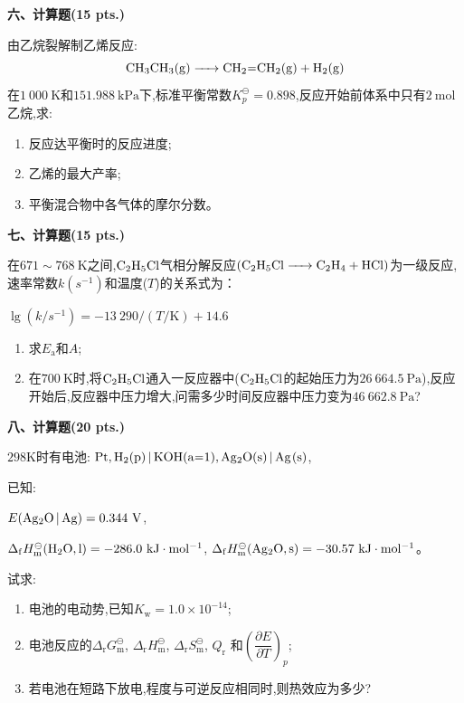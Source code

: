 \vspace{0.5cm}
\noindent\textbf{六、计算题(15 pts.)}

由乙烷裂解制乙烯反应:
\[
\ce{CH3CH3(g) -> CH2=CH2(g) + H2(g)}
\]
在$1\ 000\ \mathrm{K}$和$151.988\ \mathrm{kPa}$下,标准平衡常数$K_p^\ominus=0.898$,反应开始前体系中只有$2\ \mathrm{mol}$乙烷,求:
\begin{enumerate}[label=(\arabic*), itemsep=1ex]
    \item 反应达平衡时的反应进度;
    \item 乙烯的最大产率;
    \item 平衡混合物中各气体的摩尔分数。
\end{enumerate}

\vspace{0.5cm}
\noindent\textbf{七、计算题(15 pts.)}

在$671\sim768\ \mathrm{K}$之间,$\ce{C2H5Cl}$气相分解反应$\ce{(C2H5Cl -> C2H4 + HCl)}$为一级反应,速率常数$k(s^{-1})$和温度($T$)的关系式为：

    {\centering
    $\lg(k/s^{-1})=-13\ 290/(T/\mathrm{K})+14.6$ \par
    }

\begin{enumerate}[label=(\arabic*), itemsep=1ex]
    \item 求$E_\mathrm{a}$和$A$;
    \item 在$700\ \mathrm{K}$时,将$\ce{C2H5Cl}$通入一反应器中($\ce{C2H5Cl}$的起始压力为$26\ 664.5\ \mathrm{Pa}$),反应开始后,反应器中压力增大,问需多少时间反应器中压力变为$46\ 662.8\ \mathrm{Pa}$?
\end{enumerate}

\vspace{0.5cm}
\noindent\textbf{八、计算题(20 pts.)}

$298\mathrm{K}$时有电池:
$\ce{Pt,H2(p) | KOH(a=1),Ag2O(s) | Ag(s)}$,

已知:

$E(\ce{Ag2O | Ag})=0.344\ \mathrm{V}$,

$\Delta_\mathrm{f}H_\mathrm{m}^\ominus(\ce{H2O,l})=-286.0\ \mathrm{kJ\cdot mol^{-1}}$, $\Delta_\mathrm{f}H_\mathrm{m}^\ominus(\ce{Ag2O,s})=-30.57\ \mathrm{kJ\cdot mol^{-1}}$。

试求:
\begin{enumerate}[label=(\arabic*), itemsep=1ex]
    \item 电池的电动势,已知$K_\mathrm{w}=1.0\times10^{-14}$;
    \item 电池反应的$\Delta_\mathrm{r}G_\mathrm{m}^\ominus$, $\Delta_\mathrm{r}H_\mathrm{m}^\ominus$, $\Delta_\mathrm{r}S_\mathrm{m}^\ominus$, $Q_\mathrm{r}$ 和$\left(\dfrac{\partial E}{\partial T}\right)_p$;
    \item 若电池在短路下放电,程度与可逆反应相同时,则热效应为多少?
\end{enumerate}